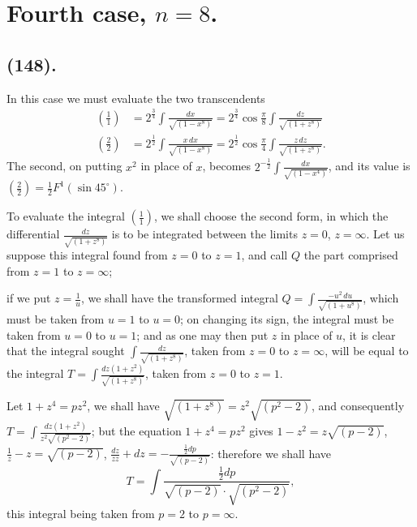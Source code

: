 \documentclass{article}
\begin{document}
\section*{Fourth case, $n=8$.}

\subsection*{(148).}

In this case we must evaluate the two transcendents
\[ \begin{aligned} \left(\frac{1}{1}\right)&=2^{\frac{3}{4}}\int\frac{dx}{\sqrt{(1-x^{8})}}=2^{\frac{3}{4}}\cos\frac{\pi}{8}\int\frac{dz}{\sqrt{(1+z^{8})}}\\ \left(\frac{2}{2}\right)&=2^{\frac{1}{2}}\int\frac{x\,dx}{\sqrt{(1-x^{8})}}=2^{\frac{1}{2}}\cos\frac{\pi}{4}\int\frac{z\,dz}{\sqrt{(1+z^{8})}}. \end{aligned} \]
The second, on putting $x^{2}$ in place of $x$, becomes $2^{-\frac{1}{2}}\displaystyle\int\frac{dx}{\sqrt{(1-x^{4})}}$, and its value is $\left(\frac{2}{2}\right)=\frac{1}{2}F^{1}(\sin 45^{\circ})$.

To evaluate the integral $\left(\frac{1}{1}\right)$, we shall choose the second form, in which the differential $\frac{dz}{\sqrt{(1+z^{8})}}$ is to be integrated between the limits $z=0$, $z=\infty$. Let us suppose this integral found from $z=0$ to $z=1$, and call $Q$ the part comprised from $z=1$ to $z=\infty$;

if we put $z=\frac{1}{u}$, we shall have the transformed integral $Q=\displaystyle\int\frac{-u^{2}\,du}{\sqrt{(1+u^{8})}}$, which must be taken from $u=1$ to $u=0$; on changing its sign, the integral must be taken from $u=0$ to $u=1$; and as one may then put $z$ in place of $u$, it is clear that the integral sought $\displaystyle\int\frac{dz}{\sqrt{(1+z^{8})}}$, taken from $z=0$ to $z=\infty$, will be equal to the integral $T=\displaystyle\int\frac{dz(1+z^{2})}{\sqrt{(1+z^{8})}}$, taken from $z=0$ to $z=1$.

Let $1+z^{4}=pz^{2}$, we shall have $\sqrt{(1+z^{8})}=z^{2}\sqrt{(p^{2}-2)}$, and consequently $T=\displaystyle\int\frac{dz(1+z^{2})}{z^{2}\sqrt{(p^{2}-2)}}$; but the equation $1+z^{4}=pz^{2}$ gives $1-z^{2}=z\sqrt{(p-2)}$, $\frac{1}{z}-z=\sqrt{(p-2)}$, $\frac{dz}{zz}+dz=-\frac{\frac{1}{2}dp}{\sqrt{(p-2)}}$: therefore we shall have
\[ T=\int\frac{\tfrac{1}{2}dp}{\sqrt{(p-2)}\cdot\sqrt{(p^{2}-2)}}, \]
this integral being taken from $p=2$ to $p=\infty$.
\end{document}
